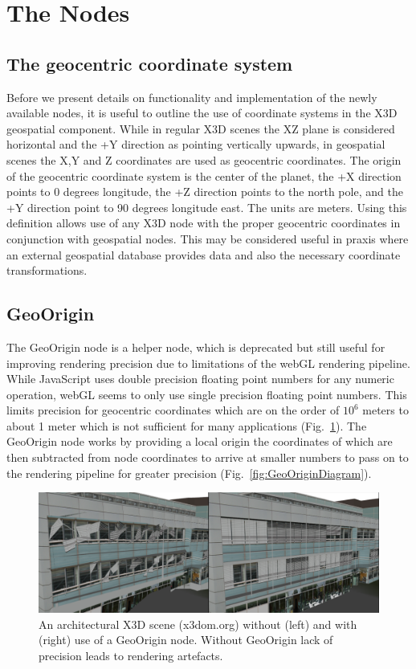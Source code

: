 \documentclass{acmsiggraph}                     %
\begin{document}
\section{The Nodes}

\subsection{The geocentric coordinate system}

Before we present details on functionality and implementation of the newly available nodes, it is useful to outline the use of coordinate systems in the X3D geospatial component. While in regular X3D scenes the XZ plane is considered horizontal and the +Y direction as pointing vertically upwards, in geospatial scenes the X,Y and Z coordinates are used as geocentric coordinates. The origin of the geocentric coordinate system is the center of the planet, the +X direction points to 0 degrees longitude, the +Z direction points to the north pole, and the +Y direction point to 90 degrees longitude east. The units are meters. Using this definition allows use of any X3D node with the proper geocentric coordinates in conjunction with geospatial nodes. This may be considered useful in praxis where an external geospatial database provides data and also the necessary coordinate transformations.

\subsection{GeoOrigin}

The GeoOrigin node is a helper node, which is deprecated but still useful for improving rendering precision due to limitations of the webGL rendering pipeline. While JavaScript uses double precision floating point numbers for any numeric operation, webGL seems to only use single precision floating point numbers. This limits precision for geocentric coordinates which are on the order of $10^{6}$ meters to about 1 meter which is not sufficient for many applications (Fig.~\ref{fig:GeoOriginImage}). The GeoOrigin node works by providing a local origin the coordinates of which are then subtracted from node coordinates to arrive at smaller numbers to pass on to the rendering pipeline for greater precision (Fig.~\ref{fig:GeoOriginDiagram}).

\begin{figure}[htbp]
\centering
\includegraphics[width=6.6in]{GeoOriginImage.png}
\caption{An architectural X3D scene (x3dom.org) without (left) and with (right) use of a GeoOrigin node. Without GeoOrigin lack of precision leads to rendering artefacts.}
\label{fig:GeoOriginImage}
\end{figure}
\end{document}
